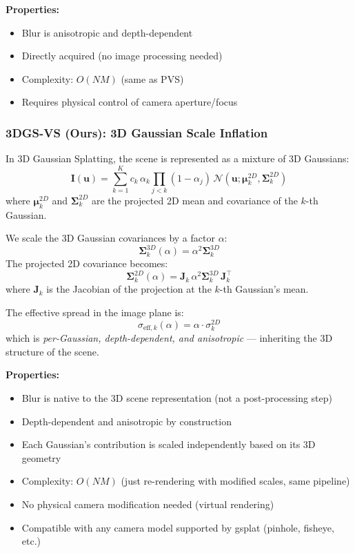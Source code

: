 \documentclass[11pt]{article}
\begin{document}
\textbf{Properties:}
\begin{itemize}
    \item Blur is anisotropic and depth-dependent
    \item Directly acquired (no image processing needed)
    \item Complexity: $O(NM)$ (same as PVS)
    \item Requires physical control of camera aperture/focus
\end{itemize}

\subsubsection{3DGS-VS (Ours): 3D Gaussian Scale Inflation}

In 3D Gaussian Splatting, the scene is represented as a mixture of 3D Gaussians:
\begin{equation}
    \mathbf{I}(\mathbf{u}) = \sum_{k=1}^{K} c_k \, \alpha_k \prod_{j<k}(1-\alpha_j) \, \mathcal{N}(\mathbf{u}; \boldsymbol{\mu}_k^{2D}, \boldsymbol{\Sigma}_k^{2D})
\end{equation}
where $\boldsymbol{\mu}_k^{2D}$ and $\boldsymbol{\Sigma}_k^{2D}$ are the projected 2D mean and covariance of the $k$-th Gaussian.

We scale the 3D Gaussian covariances by a factor $\alpha$:
\begin{equation}
    \boldsymbol{\Sigma}_k^{3D}(\alpha) = \alpha^2 \boldsymbol{\Sigma}_k^{3D}
\end{equation}
The projected 2D covariance becomes:
\begin{equation}
    \boldsymbol{\Sigma}_k^{2D}(\alpha) = \mathbf{J}_k \, \alpha^2 \boldsymbol{\Sigma}_k^{3D} \, \mathbf{J}_k^\top
\end{equation}
where $\mathbf{J}_k$ is the Jacobian of the projection at the $k$-th Gaussian's mean.

The effective spread in the image plane is:
\begin{equation}
    \sigma_{\text{eff},k}(\alpha) = \alpha \cdot \sigma_k^{2D}
\end{equation}
which is \emph{per-Gaussian, depth-dependent, and anisotropic} --- inheriting the 3D structure of the scene.

\textbf{Properties:}
\begin{itemize}
    \item Blur is native to the 3D scene representation (not a post-processing step)
    \item Depth-dependent and anisotropic by construction
    \item Each Gaussian's contribution is scaled independently based on its 3D geometry
    \item Complexity: $O(NM)$ (just re-rendering with modified scales, same pipeline)
    \item No physical camera modification needed (virtual rendering)
    \item Compatible with any camera model supported by gsplat (pinhole, fisheye, etc.)
\end{itemize}
\end{document}
